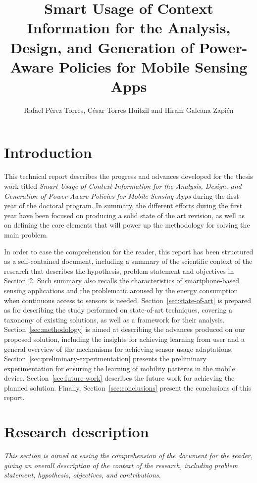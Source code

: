 \documentclass[ENG,PhD]{cinvestav}
\title{Smart Usage of Context Information for the Analysis, Design, and Generation of Power-Aware Policies for Mobile Sensing Apps}
\author{Rafael Pérez Torres, César Torres Huitzil and Hiram Galeana Zapién}
\begin{document}
\makeintropages



\section{Introduction}
\label{sec:introduction}
This technical report describes the progress and advances developed for the thesis work titled \emph{Smart Usage of Context Information for the Analysis, Design, and Generation of Power-Aware Policies for Mobile Sensing Apps} during the first year of the doctoral program.
In summary, the different efforts during the first year have been focused on producing a solid state of the art revision, as well as on defining the core elements that will power up the methodology for solving the main problem.

In order to ease the comprehension for the reader, this report has been structured as a self-contained document, including a summary of the scientific context of the research that describes the hypothesis, problem statement and objectives in Section~\ref{sub:research-context}.
Such summary also recalls the characteristics of smartphone-based sensing applications and the problematic aroused by the energy consumption when continuous access to sensors is needed.
Section~\ref{sec:state-of-art} is prepared as for describing the study performed on state-of-art techniques, covering a taxonomy of existing solutions, as well as a framework for their analysis.
Section~\ref{sec:methodology} is aimed at describing the advances produced on our proposed solution, including the insights for achieving learning from user and a general overview of the mechanisms for achieving sensor usage adaptations.
Section~\ref{sec:preliminary-experimentation} presents the preliminary experimentation for ensuring the learning of mobility patterns in the mobile device.
Section~\ref{sec:future-work} describes the future work for achieving the planned solution.
Finally, Section~\ref{sec:conclusions} present the conclusions of this report.










\section{Research description}
\label{sub:research-context}
\emph{This section is aimed at easing the comprehension of the document for the reader, giving an overall description of the context of the research, including problem statement, hypothesis, objectives, and contributions.}
\end{document}
